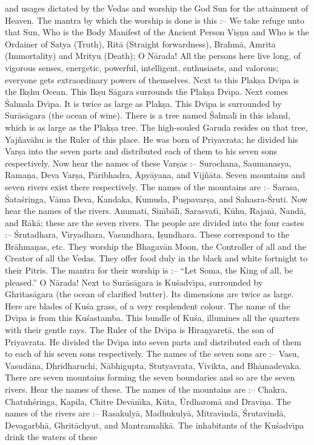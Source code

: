 and usages dictated by the Vedas and worship the God Sun for the attainment of Heaven. The mantra by which the worship is done is this :-- We take refuge unto that Sun, Who is the Body Manifest of the Ancient Person Vi\d{s}\d{n}u and Who is the Ordainer of Satya (Truth), Rit\=a (Straight forwardness), Brahm\=a, Amrita (Immortality) and Mrityu (Death); O N\=arada! All the persons here live long, of vigorous senses, energetic, powerful, intelligent, enthusiasts, and valorous; everyone gets extraordinary powers of themselves. Next to this Plak\d{s}a Dv\={\i}pa is the Ik\d{s}hu Ocean. This Ik\d{s}u S\=agara surrounds the Plak\d{s}a Dv\={\i}pa. Next comes \'Salmala Dv\={\i}pa. It is twice as large as Plak\d{s}a. This Dv\={\i}pa is surrounded by Sur\=as\=agara (the ocean of wine). There is a tree named \'Salmal\={\i} in this island, which is as large as the Plak\d{s}a tree. The high-souled Garuda resides on that tree, Yaj\~nav\=ahu is the Ruler of this place. He was born of Priyavrata; he divided his Var\d{s}a into the seven parts and distributed each of them to his seven sons respectively. Now hear the names of these Var\d{s}as :-- Surochana, Saumanasya, Rama\d{n}a, Deva Var\d{s}a, P\=aribhadra, \=Apy\=ayana, and Vij\~n\=ata. Seven mountains and seven rivers exist there respectively. The names of the mountains are :-- Sarasa, \'Sata\'sringa, V\=ama Deva, Kandaka, Kumuda, Pu\d{s}pavar\d{s}a, and Sahasra-\'Sruti. Now hear the names of the rivers. Anumati, Sin\={\i}b\=al\={\i}, Sarasvat\={\i}, K\=uhu, Rajan\={\i}, Nand\=a, and R\=ak\=a; these are the seven rivers. The people are divided into the four castes :-- \'Srutadhara, V\={\i}ryadhara, Vasundhara, I\d{s}undhara. These correspond to the Br\=ahma\d{n}as, etc. They worship the Bhagav\=an Moon, the Controller of all and the Creator of all the Vedas. They offer food duly in the black and white fortnight to their Pitris. The mantra for their worship is :-- ``Let Soma, the King of all, be pleased.'' O N\=arada! Next to Sur\=as\=agara is Ku\'sadv\={\i}pa, surrounded by Ghritas\=agara (the ocean of clarified butter). Its dimensions are twice as large. Here are blades of Ku\'sa grass, of a very resplendent colour. The name of the Dv\={\i}pa is from this Ku\'sastamba. This bundle of Ku\'sa, illumines all the quarters with their gentle rays. The Ruler of the Dv\={\i}pa is Hira\d{n}yaret\=a, the son of Priyavrata. He divided the Dv\={\i}pa into seven parts and distributed each of them to each of his seven sons respectively. The names of the seven sons are :-- Vasu, Vasud\=ana, Dhridharuchi, N\=abhigupta, Stutyavrata, Vivikta, and Bh\=amadevaka. There are seven mountains forming the seven boundaries and so are the seven rivers. Hear the names of these. The names of the mountains are :-- Chakra, Chatuh\'sringa, Kapila, Chitre Dev\=an\={\i}ka, K\=uta, \=Urdharom\=a and Dravi\d{n}a. The names of the rivers are :-- Rasakuly\=a, Madhukuly\=a, Mitravind\=a, \'Srutavind\=a, Devagarbh\=a, Ghrit\=achyut, and Mantramalik\=a. The inhabitants of the Ku\'sadv\={\i}pa drink the waters of these

